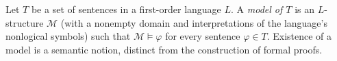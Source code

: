 
Let $T$ be a set of sentences in a first-order language $L$. A \emph{model of $T$} is an $L$-structure $\mathcal M$ (with a nonempty domain and interpretations of the language's nonlogical symbols) such that $\mathcal M\models\varphi$ for every sentence $\varphi\in T$. Existence of a model is a semantic notion, distinct from the construction of formal proofs.
